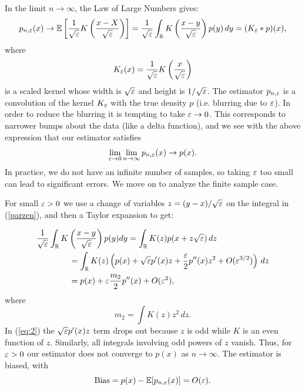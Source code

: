 In the limit $n\rightarrow \infty$, the Law of Large Numbers gives:
\begin{equation}
p_{n,\varepsilon}(x)
\rightarrow \mathbb{E}\left[\frac{1}{\sqrt{\varepsilon}}K\left(\frac{x-X}{\sqrt{\varepsilon}}\right)  \right]
= \frac{1}{\sqrt{\varepsilon}} \int_\mathbb{R} K\left(\frac{x-y}{\sqrt{\varepsilon}}\right)p(y)\,dy
= (K_\varepsilon \ast p)(x),
\label{parzen}
\end{equation}
where $$K_\varepsilon(x) = \displaystyle \frac{1}{\sqrt{\varepsilon}} K \left(\displaystyle \frac{x}{\sqrt{\varepsilon}}\right)$$
is a scaled kernel whose width is $\sqrt{\varepsilon}$ and height is $1/\sqrt{\varepsilon}$.
The estimator $p_{n,\varepsilon}$ is a convolution of the kernel $K_\varepsilon$ with the true density $p$ (i.e. blurring due to $\varepsilon$). In order to reduce the blurring it is tempting to take
$\varepsilon \rightarrow 0$. This corresponds to narrower bumps about the data (like a delta function), and we see with the above expression that our estimator satisfies $$\lim_{\varepsilon \to 0}\lim_{n\to \infty} p_{n,\varepsilon}(x) \rightarrow p(x).$$
In practice, we do not have an infinite number of samples, so taking $\varepsilon$ too small can lead to significant errors. We move on to analyze the finite sample case.

For small $\varepsilon>0$ we use a change of variables $z = (y-x)/\sqrt{\varepsilon}$ on the integral in (\ref{parzen}), and then a Taylor expansion to get:

\begin{align}
& \frac{1}{\sqrt{\varepsilon}}\int_\mathbb{R} K\left(\frac{x-y}{\sqrt{\varepsilon}}\right)p(y)dy = \int_\mathbb{R} K(z)p(x+z\sqrt{\varepsilon})\,dz\nonumber\\
& \qquad \qquad = \int_\mathbb{R} K(z)\left(p(x)+\sqrt{\varepsilon}p^\prime(x) z + \frac{\varepsilon}{2}p^{\prime \prime}(x) z^2 + O(\varepsilon^{3/2})\right)\,dz\nonumber\\
& \qquad \qquad = p(x) + \varepsilon \frac{m_2}{2} p^{\prime\prime} (x) + O(\varepsilon^2), \label{eq:2}
\end{align}
where $$m_2 = \int K(z)z^2\,dz.$$
In (\ref{eq:2}) the $\sqrt{\varepsilon}p^\prime(x) z$ term drops out because $z$ is odd while $K$ is an even function of $z$. Similarly, all integrals involving odd powers of $z$ vanish.
Thus, for $\varepsilon>0$ our estimator does not converge to $p(x)$ as $n\to \infty$. The estimator is biased, with 
$$\text{Bias} = p(x) - \mathbb{E}[p_{n,\varepsilon}(x)] = O(\varepsilon).$$

